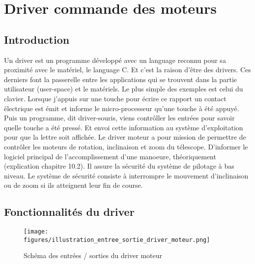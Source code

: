 \chapter{Driver commande des moteurs}

\section{Introduction}
Un driver est un programme développé avec un language reconnu pour sa proximité avec le matériel, le language C. Et c'est la raison d'être des drivers. Ces derniers font la passerelle entre les applications qui se trouvent dans la partie utilisateur (user-space) et le matériels. \newline Le plus simple des exemples est celui du clavier. Lorsque j'appuis sur une touche pour écrire ce rapport un contact électrique est émit et informe le micro-processeur qu'une touche à été appuyé. Puis un programme, dit driver-souris, viens contrôller les entrées pour savoir quelle touche a été pressé. Et envoi cette information au système d'exploitation pour que la lettre soit affichée.\newline 
Le driver moteur a pour mission de permettre de contrôler les moteurs de rotation, inclinaison et zoom du télescope. D'informer le logiciel principal de l'accomplissement d'une manoeure, théoriquement (explication chapitre 10.2). Il assure la sécurité du système de pilotage à bas niveau. Le système de sécurité consiste à interrompre le mouvement d’inclinaison ou de zoom si ils atteignent leur fin de course.

\section{Fonctionnalités du driver}

\begin{figure}[H]
    \centering
    \texttt{[image: \\figures/illustration\_entree\_sortie\_driver\_moteur.png]}
    \decoRule
    \caption[
    Schéma des entrées / sorties du driver moteur]{
    Schéma des entrées / sorties du driver moteur}
    \label{fig:Schéma des entrées / sorties du driver moteur}
    \end{figure}

\vspace{1cm}

